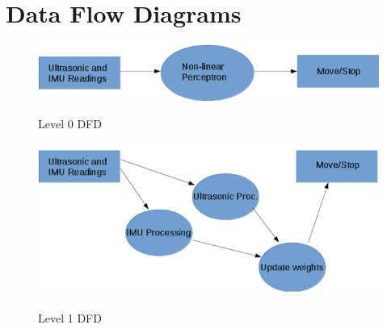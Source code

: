 \newpage

\section{Data Flow Diagrams} \label{sec:dfd}

\vfill

\begin{figure} [!h]
	\centering
	\caption{Level 0 DFD}
		\includegraphics{dfd_1.png}
	\label{fig:dfd 1}
\end{figure}
\vfill

\begin{figure} [!h]
	\centering
	\caption{Level 1 DFD}
		\includegraphics{dfd_2.png}
	\label{fig:dfd 2}
\end{figure}

\vfill